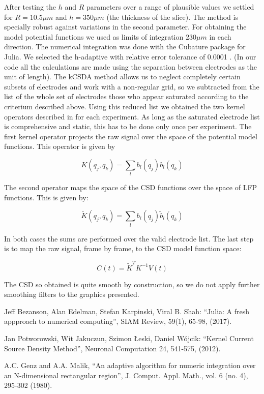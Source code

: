 \documentclass{article}
\begin{document}
After testing the $h$ and $R$ parameters over a range of plausible values we settled for $R=10.5 \mu m $ and $h=350 \mu m$ (the thickness of the slice). The method is specially robust against variations in the second parameter. For obtaining the model potential functions we used as limits of integration $230 \mu m$ in each direction. The numerical integration was done with the Cubature package  for Julia. We selected the h-adaptive with relative error tolerance of 0.0001 \cite{Genz1980}. (In our code all the calculations are made using the separation between electrodes as the unit of length).  
  The kCSDA method allows us to neglect completely certain subsets of electrodes and work with a non-regular grid, so we subtracted from the list of the whole set of electrodes those who appear saturated according to the criterium described above. Using this reduced list we obtained the two kernel operators described in \cite{Potworowski2012} for each experiment. As long as the saturated electrode list is comprehensive and static, this has to be done only once per experiment. The first kernel operator projects the raw signal over the space of the potential model functions. This operator is given by

 \begin{equation}
    K(q_j,q_k)=\sum_l b_l(q_j)b_l(q_k)
 \end{equation}
	
 The second operator maps the space of the CSD functions over the space of LFP
 functions. This is given by:

 \begin{equation}
   \tilde{K}(q_j,q_k)=\sum_l b_l(q_j)\tilde{b}_l(q_k)
 \end{equation}

In both cases the sums are performed over the valid electrode list.
The last step is to map the raw signal, frame by frame, to the CSD model function space:

\begin{equation}
  C(t)=\tilde{K}^TK^{-1} V(t)
\end{equation}

The CSD so obtained is quite smooth by construction, so we do not apply further smoothing filters to the graphics presented.


\begin{thebibliography}{20}



    Jeff Bezanson, Alan Edelman, Stefan Karpinski, Viral B. Shah:
            ``Julia: A fresh appproach to numerical computing'', SIAM Review, 59(1), 65-98, (2017).

   Jan Potworowski, Wit Jakuczun, Szimon Łeski, Daniel Wójcik:
            ``Kernel Current Source Density Method'', Neuronal Computation 24, 541-575, (2012). 

    A.C. Genz and A.A. Malik,  ``An adaptive algorithm for numeric integration over an N-dimensional rectangular region'', J. Comput. Appl. Math., vol. 6 (no. 4), 295-302 (1980).

  \end{thebibliography}
  
\end{document}
